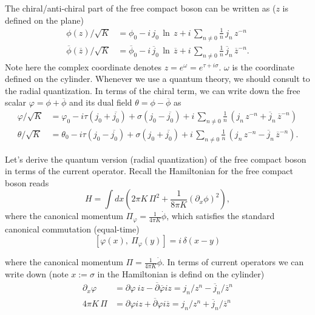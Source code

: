 The chiral/anti-chiral part of the free compact boson can be written as ($z$ is defined on the plane)
\begin{equation}
	\begin{split}
		\phi(z)/\sqrt{K} &= \phi_0 -i\,j_0\,\ln \,z + i\,\sum_{n\neq0} \frac{1}{n}\,j_n\,z^{-n} \\
		\overline{\phi}(\overline{z})/\sqrt{K} &= \overline{\phi}_0 -i\,\overline{j}_0\,\ln \, \overline{z} + i\,\sum_{n\neq0} \frac{1}{n}\,\overline{j}_n\,{\overline{z}}^{-n}.
	\end{split}
\end{equation} 
Note here the complex coordinate denotes $z = e^\omega = e^{\tau + i\sigma}$. $\omega$ is the coordinate defined on the cylinder. Whenever we use a quantum theory, we should consult to the radial quantization. In terms of the chiral term, we can write down the free scalar $\varphi = \phi + \overline{\phi}$ and its dual field $\theta = \phi - \overline{\phi}$ as
\begin{equation}
	\begin{split}
		\varphi/\sqrt{K} &= \varphi_0 -i \tau \left(j_0 + \overline{j_0}\right) + \sigma \left(j_0 - \overline{j_0}\right) + i\,\sum_{n\neq0} \frac{1}{n}\,\left( j_n\,z^{-n}+ \overline{j}_n\,{\overline{z}}^{-n}\right)\\
		\theta/\sqrt{K} &= \theta_0 -i \tau \left(j_0 - \overline{j_0}\right) + \sigma \left(j_0 + \overline{j_0}\right) + i\,\sum_{n\neq0} \frac{1}{n}\,\left( j_n\,z^{-n}- \overline{j}_n\,{\overline{z}}^{-n}\right).
	\end{split}
\end{equation}

Let's derive the quantum version (radial quantization) of the free compact boson in terms of the current operator. Recall the Hamiltonian for the free compact boson reads
\begin{equation}
	H = \int dx \left( 2\pi K\, \Pi^2 + \frac{1}{8\pi K} {\left(\partial_x \phi\right)}^2 \right),
\end{equation}
where the canonical momentum $\Pi_\varphi = \frac{1}{4\pi K} \dot{\phi}$, which satisfies the standard canonical commutation (equal-time)
\begin{equation}
	\left[\varphi(x), \ \Pi_\varphi(y) \right] = i\,\delta(x-y)
\end{equation}

where the canonical momentum $\Pi = \frac{1}{4\pi K} \dot{\phi}$. In terms of current operators we can write down (note $x := \sigma$ in the Hamiltonian is defind on the cylinder)
\begin{equation}
	\begin{aligned}
		\partial_x \varphi &= \partial \varphi\ i z - \overline{\partial}\overline{\varphi} i z = j_n/z^n -\overline{j}_n / \overline{z}^n \\
		4\pi K\, \Pi &= \partial \varphi i z + \overline{\partial} \varphi i \overline{z} = j_n/z^n + \overline{j}_n / \overline{z}^n
	\end{aligned}
\end{equation}

